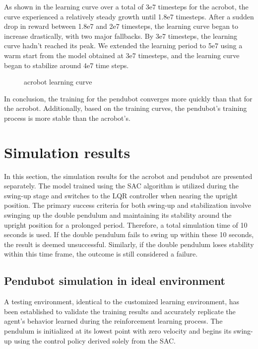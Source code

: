 As shown in the learning curve over a total of 3e7 timesteps for the acrobot, the curve experienced a relatively steady growth until 1.8e7 timesteps. After a sudden drop in reward between 1.8e7 and 2e7 timesteps, the learning curve began to increase drastically, with two major fallbacks. By 3e7 timesteps, the learning curve hadn't reached its peak. We extended the learning period to 5e7 using a warm start from the model obtained at 3e7 timesteps, and the learning curve began to stabilize around 4e7 time steps.

\begin{figure}[H]
    \centering
    \caption{acrobot learning curve}
    \label{fig:image_b}
\end{figure}

In conclusion, the training for the pendubot converges more quickly than that for the acrobot. Additionally, based on the training curves, the pendubot's training process is more stable than the acrobot's.

\section{Simulation results}
In this section, the simulation results for the acrobot and pendubot are presented separately. The model trained using the SAC algorithm is utilized during the swing-up stage and switches to the LQR controller when nearing the upright position. The primary success criteria for both swing-up and stabilization involve swinging up the double pendulum and maintaining its stability around the upright position for a prolonged period. Therefore, a total simulation time of 10 seconds is used. If the double pendulum fails to swing up within these 10 seconds, the result is deemed unsuccessful. Similarly, if the double pendulum loses stability within this time frame, the outcome is still considered a failure.

\subsection{Pendubot simulation in ideal environment}
A testing environment, identical to the customized learning environment, has been established to validate the training results and accurately replicate the agent's behavior learned during the reinforcement learning process. The pendulum is initialized at its lowest point with zero velocity and begins its swing-up using the control policy derived solely from the SAC.

